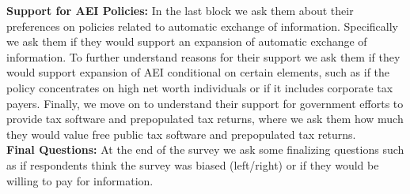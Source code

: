 \documentclass[11pt]{article}
\begin{document}
\textbf{Support for AEI Policies:}
In the last block we ask them about their preferences on policies related to automatic exchange of information. Specifically we ask them if they would support an expansion of automatic exchange of information. To further understand reasons for their support we ask them if they would support expansion of AEI conditional on certain elements, such as if the policy concentrates on high net worth individuals or if it includes corporate tax payers. Finally, we move on to understand their support for government efforts to provide tax software and prepopulated tax returns, where we ask them how much they would value free public tax software and prepopulated tax returns. \\[0.5em]
\textbf{Final Questions:}
At the end of the survey we ask some finalizing questions such as if respondents think the survey was biased (left/right) or if they would be willing to pay for information. 
\end{document}
